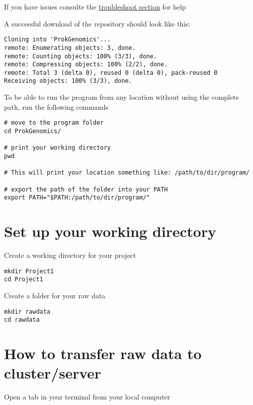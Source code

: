 \documentclass[
]{book}
\begin{document}
If you have issues consulte the \href{troubleshooting.html}{troubleshoot section} for help

A successful download of the repository should look like this:

\begin{verbatim}
Cloning into 'ProkGenomics'...
remote: Enumerating objects: 3, done.
remote: Counting objects: 100% (3/3), done.
remote: Compressing objects: 100% (2/2), done.
remote: Total 3 (delta 0), reused 0 (delta 0), pack-reused 0
Receiving objects: 100% (3/3), done.
\end{verbatim}

To be able to run the program from any location without using the complete path, run the following commands

\begin{verbatim}
# move to the program folder
cd ProkGenomics/

# print your working directory
pwd 

# This will print your location something like: /path/to/dir/program/

# export the path of the folder into your PATH
export PATH="$PATH:/path/to/dir/program/"
\end{verbatim}

\hypertarget{set-up-your-working-directory}{%
\section{Set up your working directory}\label{set-up-your-working-directory}}

Create a working directory for your project

\begin{verbatim}
mkdir Project1
cd Project1
\end{verbatim}

Create a folder for your raw data

\begin{verbatim}
mkdir rawdata
cd rawdata
\end{verbatim}

\hypertarget{how-to-transfer-raw-data-to-clusterserver}{%
\section{How to transfer raw data to cluster/server}\label{how-to-transfer-raw-data-to-clusterserver}}

Open a tab in your terminal from your local computer
\end{document}
